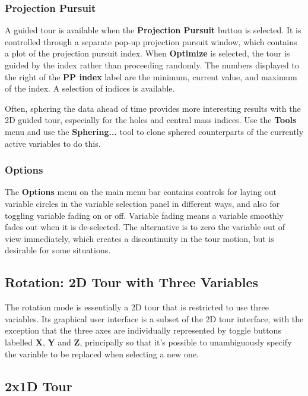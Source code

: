 \documentclass[11pt]{article}
\begin{document}
\subsubsection{Projection Pursuit}

A guided tour is available when the {\bf Projection Pursuit} button is
selected. It is controlled through a separate pop-up projection
pursuit window, which contains a plot of the projection pursuit index.
When {\bf Optimize} is selected, the tour is guided by the index
rather than proceeding randomly.  The numbers displayed to the right
of the {\bf PP index} label are the minimum, current value, and
maximum of the index.  A selection of indices is available.

Often, sphering the data ahead of time provides more interesting
results with the 2D guided tour, especially for the holes and central
mass indices. Use the {\bf Tools} menu and use the {\bf Sphering...}
tool to clone sphered counterparts of the currently active variables
to do this.

\subsubsection{Options}

The {\bf Options} menu on the main menu bar contains controls for
laying out variable circles in the variable selection panel in
different ways, and also for toggling variable fading on or
off. Variable fading means a variable smoothly fades out when it is
de-selected. The alternative is to zero the variable out of view
immediately, which creates a discontinuity in the tour motion, but is
desirable for some situations.

\subsection{Rotation: 2D Tour with Three Variables}
\label{slbl:Rotation}

The rotation mode is essentially a 2D tour that is restricted to use
three variables.  Its graphical user interface is a subset of the 2D
tour interface, with the exception that the three axes are individually
represented by toggle buttons labelled {\bf X}, {\bf Y} and {\bf Z},
principally so that it's possible to unambiguously specify the variable
to be replaced when selecting a new one.

\subsection{2x1D Tour}
\label{slbl:2x1DTour}
\end{document}
